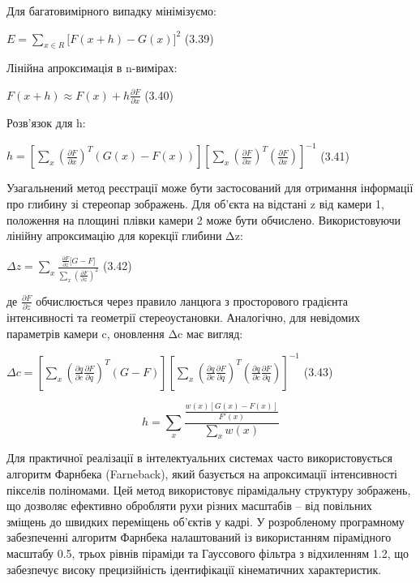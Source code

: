 \documentclass[
]{article}
\begin{document}
Для багатовимірного випадку мінімізуємо:

\(E = \sum_{x \in R}^{}{\lbrack F(x + h) - G(x)\rbrack^{2}}\) (3.39)

Лінійна апроксимація в n-вимірах:

\(F(x + h) \approx F(x) + h\frac{\partial F}{\partial x}\) (3.40)

Розв'язок для h:

\(h = \left\lbrack {\sum_{x}^{}{\left( \frac{\partial F}{\partial x} \right)^{T}\left( G(x) - F(x) \right)}} \right\rbrack\left\lbrack {\sum_{x}^{}{\left( \frac{\partial F}{\partial x} \right)^{T}\left( \frac{\partial F}{\partial x} \right)}} \right\rbrack^{- 1}\) (3.41)

Узагальнений метод реєстрації може бути застосований для отримання інформації про глибину зі стереопар зображень. Для об'єкта на відстані z від камери 1, положення на площині плівки камери 2 може бути обчислено. Використовуючи лінійну апроксимацію для корекції глибини Δz:

\(\Delta z = \sum_{x}^{}\frac{\frac{\partial F}{\partial z}\lbrack G - F\rbrack}{\sum_{x}^{}\left( \frac{\partial F}{\partial z} \right)^{2}}\) (3.42)

де \(\frac{\partial F}{\partial z}\) обчислюється через правило ланцюга з просторового градієнта інтенсивності та геометрії стереоустановки. Аналогічно, для невідомих параметрів камери c, оновлення Δc має вигляд:

\(\Delta c = \left\lbrack {\sum_{x}^{}{\left( {\frac{\partial q}{\partial c}\frac{\partial F}{\partial q}} \right)^{T}(G - F)}} \right\rbrack\left\lbrack {\sum_{x}^{}{\left( {\frac{\partial q}{\partial c}\frac{\partial F}{\partial q}} \right)^{T}\left( {\frac{\partial q}{\partial c}\frac{\partial F}{\partial q}} \right)}} \right\rbrack^{- 1}\) (3.43)

\[h = \sum_{x}^{}\frac{\frac{w(x)\left\lbrack G(x) - F(x) \right\rbrack}{F'(x)}}{\sum_{x}^{}{w(x)}}\]

Для практичної реалізації в інтелектуальних системах часто використовується алгоритм Фарнбека (Farneback), який базується на апроксимації інтенсивності пікселів поліномами. Цей метод використовує пірамідальну структуру зображень, що дозволяє ефективно обробляти рухи різних масштабів -- від повільних зміщень до швидких переміщень об'єктів у кадрі. У розробленому програмному забезпеченні алгоритм Фарнбека налаштований із використанням пірамідного масштабу 0.5, трьох рівнів піраміди та Гауссового фільтра з відхиленням 1.2, що забезпечує високу прецизійність ідентифікації кінематичних характеристик.
\end{document}
